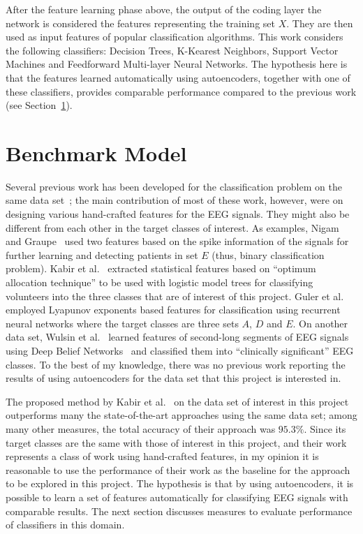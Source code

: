 \documentclass[12pt]{article}
\begin{document}
After the feature learning phase above, the output of the coding layer the network is considered the features representing the training set $X$. They are then used as input features of popular classification algorithms. This work considers the following classifiers: Decision Trees, K-Kearest Neighbors, Support Vector Machines and Feedforward Multi-layer Neural Networks. The hypothesis here is that the features learned automatically using autoencoders, together with one of these classifiers, provides comparable performance compared to the previous work (see Section~\ref{sec:benchmark}).

\section{Benchmark Model}
\label{sec:benchmark}

Several previous work has been developed for the classification problem on the same data set~\cite{andrzejak2001indications}; the main contribution of most of these work, however, were on designing various hand-crafted features for the EEG signals. They might also be different from each other in the target classes of interest. As examples, Nigam and Graupe~\cite{nigam2004neural} used two features based on the spike information of the signals for further learning and detecting patients in set $E$ (thus, binary classification problem). Kabir et al.~\cite{kabir2016epileptic} extracted statistical features based on ``optimum allocation technique'' to be used with logistic model trees for classifying volunteers into the three classes that are of interest of this project. Guler et al.~\cite{guler2005recurrent} employed Lyapunov exponents based features for classification using recurrent neural networks where the target classes are three sets $A$, $D$ and $E$. On another data set, Wulsin et al.~\cite{wulsin2011modeling} learned features of second-long segments of EEG signals using Deep Belief Networks~\cite{hinton2006reducing} and classified them into ``clinically significant'' EEG classes. To the best of my knowledge, there was no previous work reporting the results of using autoencoders for the data set that this project is interested in.

The proposed method by Kabir et al.~\cite{kabir2016epileptic} on the data set of interest in this project outperforms many the state-of-the-art approaches using the same data set; among many other measures, the total accuracy of their approach was $95.3\%$. Since its target classes are the same with those of interest in this project, and their work represents a class of work using hand-crafted features, in my opinion it is reasonable to use the performance of their work as the baseline for the approach to be explored in this project. The hypothesis is that by using autoencoders, it is possible to learn a set of features automatically for classifying EEG signals with comparable results. The next section discusses measures to evaluate performance of classifiers in this domain.
\end{document}
